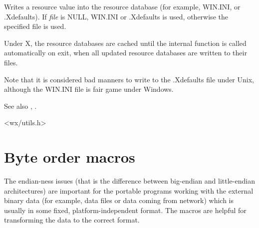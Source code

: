 \label{wxwriteresource}





Writes a resource value into the resource database (for example, WIN.INI, or
.Xdefaults). If {\it file} is NULL, WIN.INI or .Xdefaults is used,
otherwise the specified file is used.

Under X, the resource databases are cached until the internal function
 is called automatically on exit, when
all updated resource databases are written to their files.

Note that it is considered bad manners to write to the .Xdefaults
file under Unix, although the WIN.INI file is fair game under Windows.

See also , .


<wx/utils.h>

\section{Byte order macros}\label{byteordermacros}

The endian-ness issues (that is the difference between big-endian and
little-endian architectures) are important for the portable programs working
with the external binary data (for example, data files or data coming from
network) which is usually in some fixed, platform-independent format. The
macros are helpful for transforming the data to the correct format.

\label{intswapalways}


